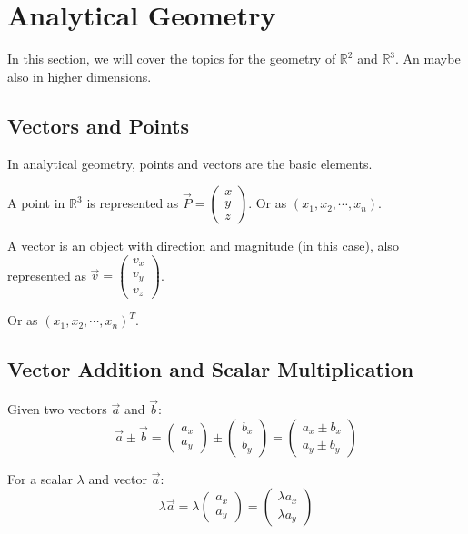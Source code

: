 \section{Analytical Geometry}

In this section, we will cover the topics for the geometry of $\mathbb{R}^2$ and $\mathbb{R}^3$.
An maybe also in higher dimensions.

\subsection{Vectors and Points}
In analytical geometry, points and vectors are the basic elements.

A point in $\mathbb{R}^3$ is represented as $\vec{P} = \begin{pmatrix} x \\ y \\ z \end{pmatrix}$.
Or as $(x_1, x_2, \cdots , x_n)$.

A vector is an object with direction and magnitude (in this case), also represented as $\vec{v} = \begin{pmatrix} v_x \\ v_y \\ v_z \end{pmatrix}$.

Or as $(x_1, x_2, \cdots , x_n)^{T}$.

\subsection{Vector Addition and Scalar Multiplication}
Given two vectors $\vec{a}$ and $\vec{b}$:
\[
	\vec{a} \pm  \vec{b} = \begin{pmatrix} a_x \\ a_y \end{pmatrix} \pm \begin{pmatrix} b_x \\ b_y \end{pmatrix} = \begin{pmatrix} a_x \pm b_x \\ a_y \pm b_y \end{pmatrix}
\]

For a scalar $\lambda$ and vector $\vec{a}$:
\[
	\lambda \vec{a} = \lambda \begin{pmatrix} a_x \\ a_y \end{pmatrix} = \begin{pmatrix} \lambda a_x \\ \lambda a_y \end{pmatrix}
\]

